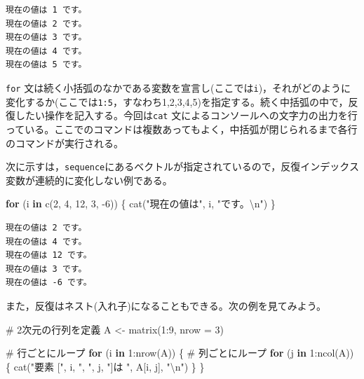 \documentclass[
  a4paper,
]{ltjsbook}
\newenvironment{Shaded}{\begin{snugshade}}{\end{snugshade}}
\newcommand{\AttributeTok}[1]{\textcolor[rgb]{0.40,0.45,0.13}{#1}}
\newcommand{\CommentTok}[1]{\textcolor[rgb]{0.37,0.37,0.37}{#1}}
\newcommand{\ControlFlowTok}[1]{\textcolor[rgb]{0.00,0.23,0.31}{\textbf{#1}}}
\newcommand{\DecValTok}[1]{\textcolor[rgb]{0.68,0.00,0.00}{#1}}
\newcommand{\FunctionTok}[1]{\textcolor[rgb]{0.28,0.35,0.67}{#1}}
\newcommand{\NormalTok}[1]{\textcolor[rgb]{0.00,0.23,0.31}{#1}}
\newcommand{\OtherTok}[1]{\textcolor[rgb]{0.00,0.23,0.31}{#1}}
\newcommand{\SpecialCharTok}[1]{\textcolor[rgb]{0.37,0.37,0.37}{#1}}
\newcommand{\StringTok}[1]{\textcolor[rgb]{0.13,0.47,0.30}{#1}}
\begin{document}
\begin{verbatim}
現在の値は 1 です。
現在の値は 2 です。
現在の値は 3 です。
現在の値は 4 です。
現在の値は 5 です。
\end{verbatim}

\texttt{for}
文は続く小括弧のなかである変数を宣言し(ここでは\texttt{i})，それがどのように変化するか(ここでは\texttt{1:5}，すなわち1,2,3,4,5)を指定する。続く中括弧の中で，反復したい操作を記入する。今回は\texttt{cat}
文によるコンソールへの文字力の出力を行っている。ここでのコマンドは複数あってもよく，中括弧が閉じられるまで各行のコマンドが実行される。

次に示すは，\texttt{sequence}にあるベクトルが指定されているので，反復インデックス変数が連続的に変化しない例である。

\begin{Shaded}
\begin{Highlighting}[]
\ControlFlowTok{for}\NormalTok{ (i }\ControlFlowTok{in} \FunctionTok{c}\NormalTok{(}\DecValTok{2}\NormalTok{, }\DecValTok{4}\NormalTok{, }\DecValTok{12}\NormalTok{, }\DecValTok{3}\NormalTok{, }\SpecialCharTok{{-}}\DecValTok{6}\NormalTok{)) \{}
  \FunctionTok{cat}\NormalTok{(}\StringTok{"現在の値は"}\NormalTok{, i, }\StringTok{"です。}\SpecialCharTok{\textbackslash{}n}\StringTok{"}\NormalTok{)}
\NormalTok{\}}
\end{Highlighting}
\end{Shaded}

\begin{verbatim}
現在の値は 2 です。
現在の値は 4 です。
現在の値は 12 です。
現在の値は 3 です。
現在の値は -6 です。
\end{verbatim}

また，反復はネスト(入れ子)になることもできる。次の例を見てみよう。

\begin{Shaded}
\begin{Highlighting}[]
\CommentTok{\# 2次元の行列を定義}
\NormalTok{A }\OtherTok{\textless{}{-}} \FunctionTok{matrix}\NormalTok{(}\DecValTok{1}\SpecialCharTok{:}\DecValTok{9}\NormalTok{, }\AttributeTok{nrow =} \DecValTok{3}\NormalTok{)}

\CommentTok{\# 行ごとにループ}
\ControlFlowTok{for}\NormalTok{ (i }\ControlFlowTok{in} \DecValTok{1}\SpecialCharTok{:}\FunctionTok{nrow}\NormalTok{(A)) \{}
  \CommentTok{\# 列ごとにループ}
  \ControlFlowTok{for}\NormalTok{ (j }\ControlFlowTok{in} \DecValTok{1}\SpecialCharTok{:}\FunctionTok{ncol}\NormalTok{(A)) \{}
    \FunctionTok{cat}\NormalTok{(}\StringTok{"要素 ["}\NormalTok{, i, }\StringTok{", "}\NormalTok{, j, }\StringTok{"]は "}\NormalTok{, A[i, j], }\StringTok{"}\SpecialCharTok{\textbackslash{}n}\StringTok{"}\NormalTok{)}
\NormalTok{  \}}
\NormalTok{\}}
\end{Highlighting}
\end{Shaded}
\end{document}
